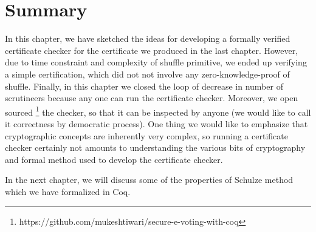 \section{Summary}
\label{sec:summary_software}
In this chapter, we have sketched the ideas for developing a formally verified certificate checker
for the certificate we produced in the last chapter. However, due to time constraint and 
complexity of shuffle primitive, 
we ended up verifying a simple certification, which did not not involve any zero-knowledge-proof 
of shuffle.  Finally, in this chapter we closed the loop of decrease in number of scrutineers because 
any one can run the certificate checker. Moreover, we open sourced 
\footnote{https://github.com/mukeshtiwari/secure-e-voting-with-coq} the checker, so 
that it can be inspected by anyone (we would like to call it correctness by democratic 
process).  One thing we would like to emphasize that cryptographic concepts are 
inherently very complex, so running a certificate checker certainly not amounts 
to understanding the various bits of cryptography and formal method used to develop the
certificate checker.

In the next chapter, we will discuss some of the properties of Schulze method which we have 
formalized in Coq. 











































   
   
   
   
   
   